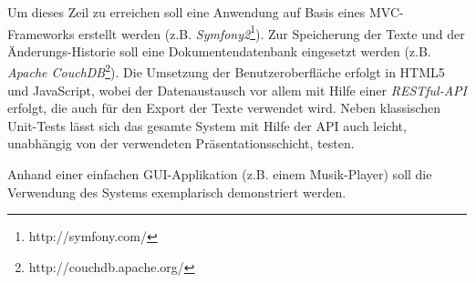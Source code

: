 \documentclass[11pt,a4paper]{article}
\begin{document}
Um dieses Zeil zu erreichen soll eine Anwendung auf Basis eines MVC-Frameworks erstellt werden (z.B. \emph{Symfony2}\footnote{http://symfony.com/}). Zur Speicherung der Texte und der Änderungs-Historie soll eine Dokumentendatenbank eingesetzt werden (z.B. \emph{Apache CouchDB}\footnote{http://couchdb.apache.org/}). Die Umsetzung der Benutzeroberfläche erfolgt in HTML5 und JavaScript, wobei der Datenaustausch vor allem mit Hilfe einer \emph{RESTful-API} erfolgt, die auch für den Export der Texte verwendet wird. Neben klassischen Unit-Tests lässt sich das gesamte System mit Hilfe der API auch leicht, unabhängig von der verwendeten Präsentationsschicht, testen.

Anhand einer einfachen GUI-Applikation (z.B. einem Musik-Player) soll die Verwendung des Systems exemplarisch  demonstriert werden.
\end{document}
